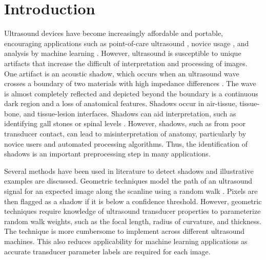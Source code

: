 \documentclass[preprint,5p,authoryear]{elsarticle}
\begin{document}




\section*{Introduction}
\label{intro}
Ultrasound devices have become increasingly affordable and portable, encouraging applications such as point-of-care ultrasound \citep{Bouhemad2011}, novice usage \citep{Sippel2011}, and analysis by machine learning \citep{Ghose2013}. However, ultrasound is susceptible to unique artifacts that increase the difficult of interpretation and processing of images. One artifact is an acoustic shadow, which occurs when an ultrasound wave crosses a boundary of two materials with high impedance differences \citep{Kremkau1986}. The wave is almost completely reflected and depicted beyond the boundary is a continuous dark region and a loss of anatomical features. Shadows occur in air-tissue, tissue-bone, and tissue-lesion interfaces. Shadows can aid interpretation, such as identifying gall stones \citep{Good1979} or spinal levels \citep{Galiano2005}. However, shadows, such as from poor transducer contact, can lead to misinterpretation of anatomy, particularly by novice users and automated processing algorithms. Thus, the identification of shadows is an important preprocessing step in many applications.

Several methods have been used in literature to detect shadows and illustrative examples are discussed. Geometric techniques model the path of an ultrasound signal for an expected image along the scanline using a random walk \citep{Karamalis2012}. Pixels are then flagged as a shadow if it is below a confidence threshold. However, geometric techniques require knowledge of ultrasound transducer properties to parameterize random walk weights, such as the focal length, radius of curvature, and thickness. The technique is more cumbersome to implement across different ultrasound machines. This also reduces applicability for machine learning applications as accurate transducer parameter labels are required for each image.
\end{document}
